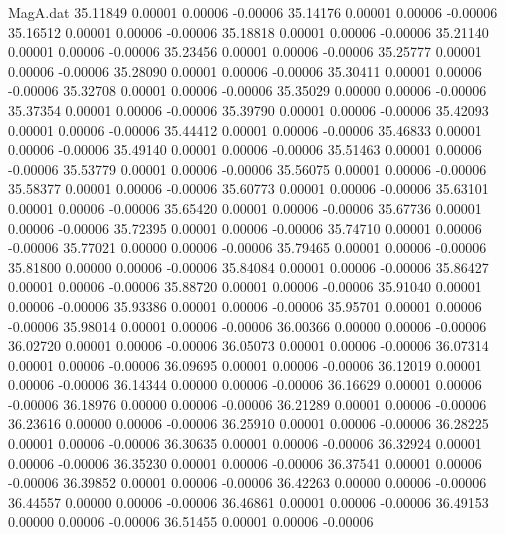 \begin{filecontents}{MagA.dat}
  35.11849    0.00001    0.00006   -0.00006
  35.14176    0.00001    0.00006   -0.00006
  35.16512    0.00001    0.00006   -0.00006
  35.18818    0.00001    0.00006   -0.00006
  35.21140    0.00001    0.00006   -0.00006
  35.23456    0.00001    0.00006   -0.00006
  35.25777    0.00001    0.00006   -0.00006
  35.28090    0.00001    0.00006   -0.00006
  35.30411    0.00001    0.00006   -0.00006
  35.32708    0.00001    0.00006   -0.00006
  35.35029    0.00000    0.00006   -0.00006
  35.37354    0.00001    0.00006   -0.00006
  35.39790    0.00001    0.00006   -0.00006
  35.42093    0.00001    0.00006   -0.00006
  35.44412    0.00001    0.00006   -0.00006
  35.46833    0.00001    0.00006   -0.00006
  35.49140    0.00001    0.00006   -0.00006
  35.51463    0.00001    0.00006   -0.00006
  35.53779    0.00001    0.00006   -0.00006
  35.56075    0.00001    0.00006   -0.00006
  35.58377    0.00001    0.00006   -0.00006
  35.60773    0.00001    0.00006   -0.00006
  35.63101    0.00001    0.00006   -0.00006
  35.65420    0.00001    0.00006   -0.00006
  35.67736    0.00001    0.00006   -0.00006
  35.72395    0.00001    0.00006   -0.00006
  35.74710    0.00001    0.00006   -0.00006
  35.77021    0.00000    0.00006   -0.00006
  35.79465    0.00001    0.00006   -0.00006
  35.81800    0.00000    0.00006   -0.00006
  35.84084    0.00001    0.00006   -0.00006
  35.86427    0.00001    0.00006   -0.00006
  35.88720    0.00001    0.00006   -0.00006
  35.91040    0.00001    0.00006   -0.00006
  35.93386    0.00001    0.00006   -0.00006
  35.95701    0.00001    0.00006   -0.00006
  35.98014    0.00001    0.00006   -0.00006
  36.00366    0.00000    0.00006   -0.00006
  36.02720    0.00001    0.00006   -0.00006
  36.05073    0.00001    0.00006   -0.00006
  36.07314    0.00001    0.00006   -0.00006
  36.09695    0.00001    0.00006   -0.00006
  36.12019    0.00001    0.00006   -0.00006
  36.14344    0.00000    0.00006   -0.00006
  36.16629    0.00001    0.00006   -0.00006
  36.18976    0.00000    0.00006   -0.00006
  36.21289    0.00001    0.00006   -0.00006
  36.23616    0.00000    0.00006   -0.00006
  36.25910    0.00001    0.00006   -0.00006
  36.28225    0.00001    0.00006   -0.00006
  36.30635    0.00001    0.00006   -0.00006
  36.32924    0.00001    0.00006   -0.00006
  36.35230    0.00001    0.00006   -0.00006
  36.37541    0.00001    0.00006   -0.00006
  36.39852    0.00001    0.00006   -0.00006
  36.42263    0.00000    0.00006   -0.00006
  36.44557    0.00000    0.00006   -0.00006
  36.46861    0.00001    0.00006   -0.00006
  36.49153    0.00000    0.00006   -0.00006
  36.51455    0.00001    0.00006   -0.00006

\end{filecontents}
